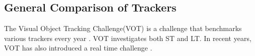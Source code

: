 \subsection{General Comparison of Trackers}
  The Visual Object Tracking Challenge(VOT) is a challenge that benchmarks various trackers every year \cite{VOT2017} \cite{VOT2020}.
  VOT investigates both ST and LT.
  In recent years, VOT has also introduced a real time challenge \cite{VOT2020}.

